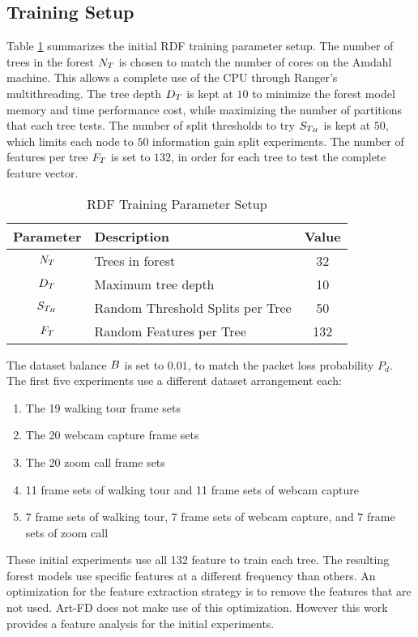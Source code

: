 \subsection{Training Setup}
\label{sec:res_train_setup}

Table \ref{tab:rdf_setup} summarizes the initial RDF training parameter setup. The number of trees in the forest $N_T$ is chosen to match the number of cores on the Amdahl machine. This allows a complete use of the CPU through Ranger's multithreading. The tree depth $D_T$ is kept at $10$ to minimize the forest model memory and time performance cost, while maximizing the number of partitions that each tree tests. The number of split thresholds to try $S_{T_H}$ is kept at $50$, which limits each node to $50$ information gain split experiments. The number of features per tree $F_T$ is set to $132$, in order for each tree to test the complete feature vector.

\begin{table}[htbp]
  \caption{RDF Training Parameter Setup}
  \label{tab:rdf_setup}
  \centering
  \begin{tabular}{clc}
  \hline
  \textbf{Parameter} & \textbf{Description} & \textbf{Value} \\
  \hline
  $N_T$ & Trees in forest & 32 \\
  $D_T$ & Maximum tree depth & 10 \\
  $S_{T_H}$ & Random Threshold Splits per Tree & 50 \\
  $F_T$ & Random Features per Tree & 132 \\
  \hline
  \end{tabular}
\end{table}

The dataset balance $B$ is set to $0.01$, to match the packet loss probability $P_d$. The first five experiments use a different dataset arrangement each:
 \begin{enumerate}
  \item The 19 walking tour frame sets
  \item The 20 webcam capture frame sets
  \item The 20 zoom call frame sets
  \item 11 frame sets of walking tour and 11 frame sets of webcam capture
  \item 7 frame sets of walking tour, 7 frame sets of webcam capture, and 7 frame sets of zoom call
 \end{enumerate}

These initial experiments use all 132 feature to train each tree. The resulting forest models use specific features at a different frequency than others. An optimization for the feature extraction strategy is to remove the features that are not used. Art-FD does not make use of this optimization. However this work provides a feature analysis for the initial experiments.

